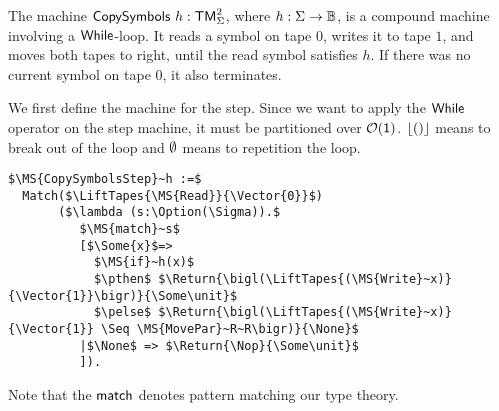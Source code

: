 The machine $\mathsf{CopySymbols}~h : \mathsf{TM}_\Sigma^2$, where $h:\Sigma\rightarrow\mathbb{B}$, is a compound machine involving a $\mathsf{While}$-loop.  It reads a symbol on tape
$0$, writes it to tape $1$, and moves both tapes to right, until the read symbol satisfies $h$.  If there was no current symbol on tape $0$, it also
terminates.

We first define the machine for the step.  Since we want to apply the $\mathsf{While}$ operator on the step machine, it must be partitioned over
$\mathcal{O}(\mathsf{1})$.  $\left\lfloor {\ensuremath{\mathsf{()}}} \right\rfloor$ means to break out of the loop and $\emptyset$ means to repetition the loop.
\begin{definition}
  \label{CopySymbols_Step}
\begin{lstlisting}[style=semicoqstyle]
$\MS{CopySymbolsStep}~h :=$
  Match($\LiftTapes{\MS{Read}}{\Vector{0}}$)
       ($\lambda (s:\Option(\Sigma)).$
          $\MS{match}~s$
          [$\Some{x}$=>
            $\MS{if}~h(x)$
            $\pthen$ $\Return{\bigl(\LiftTapes{(\MS{Write}~x)}{\Vector{1}}\bigr)}{\Some\unit}$ 
            $\pelse$ $\Return{\bigl(\LiftTapes{(\MS{Write}~x)}{\Vector{1}} \Seq \MS{MovePar}~R~R\bigr)}{\None}$ 
          |$\None$ => $\Return{\Nop}{\Some\unit}$ 
          ]).
\end{lstlisting}
\end{definition}

Note that the $\mathsf{match}$ denotes pattern matching our type theory.

